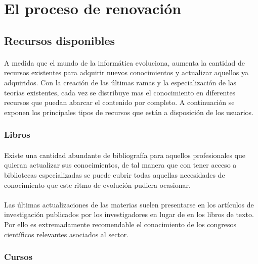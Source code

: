 \documentclass[12pt, a4paper]{report}
\begin{document}
    \section{El proceso de renovación}
    
    	\subsection{Recursos disponibles}
        \label{subsec:RecursosDisponibles}

    		\paragraph{} 
            A medida que el mundo de la informática evoluciona, aumenta la cantidad de recursos existentes para adquirir nuevos conocimientos y actualizar aquellos ya adquiridos. Con la creación de las últimas ramas y la especialización de las teorías existentes, cada vez se distribuye mas el conocimiento en diferentes recursos que puedan abarcar el contenido por completo. A continuación se exponen los principales tipos de recursos que están a disposición de los usuarios.
            
        	\subsubsection{Libros}
        		\paragraph{} 
				Existe una cantidad abundante de bibliografía para aquellos profesionales que quieran actualizar sus conocimientos, de tal manera que con tener acceso a bibliotecas especializadas se puede cubrir todas aquellas necesidades de conocimiento que este ritmo de evolución pudiera ocasionar.
                
                \paragraph{}
            	Las últimas actualizaciones de las materias suelen presentarse en los artículos de investigación publicados por los investigadores en lugar de en los libros de texto. Por ello es extremadamente recomendable el conocimiento de los congresos científicos relevantes asociados al sector.
                
    		\subsubsection{Cursos}
\end{document}
